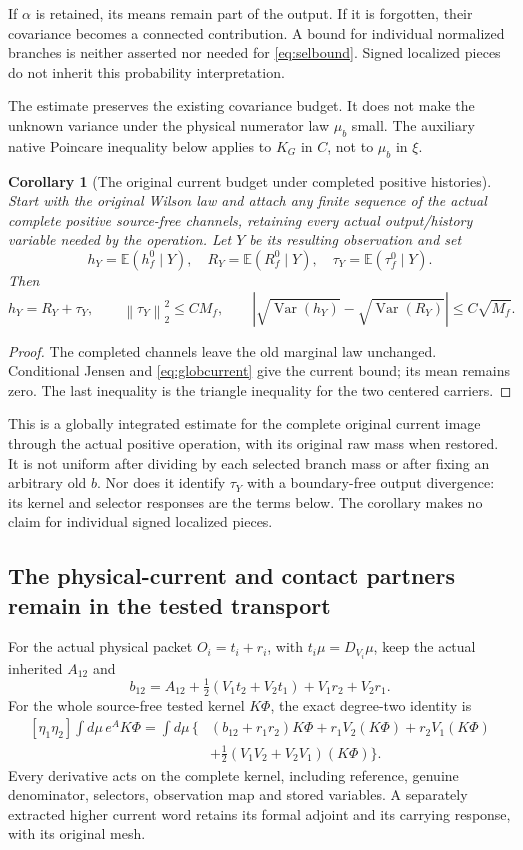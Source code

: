 \documentclass[11pt,letterpaper]{article}
\newtheorem{corollary}[theorem]{Corollary}
\theoremstyle{remark}\newtheorem{remark}[theorem]{Remark}
\newcommand{\E}{\mathbb E}
\newcommand{\Var}{\operatorname{Var}}\newcommand{\Cov}{\operatorname{Cov}}
\newcommand{\norm}[1]{\left\lVert#1\right\rVert}
\begin{document}
If $\alpha$ is retained, its means remain part of the output. If it is forgotten, their covariance becomes a connected contribution. A bound for individual normalized branches is neither asserted nor needed for \eqref{eq:selbound}. Signed localized pieces do not inherit this probability interpretation.

The estimate preserves the existing covariance budget. It does not make the unknown variance under the physical numerator law $\mu_b$ small. The auxiliary native Poincare inequality below applies to $K_G$ in $C$, not to $\mu_b$ in $\xi$.

\begin{corollary}[The original current budget under completed positive histories]\label{cor:mixedcurrent}
Start with the original Wilson law and attach any finite sequence of the actual complete positive source-free channels, retaining every actual output/history variable needed by the operation. Let $Y$ be its resulting observation and set
\[
 h_Y=\E(h_f^0\mid Y),\quad R_Y=\E(R_f^0\mid Y),\quad
 \tau_Y=\E(\tau_f^0\mid Y).
\]
Then
\[
 h_Y=R_Y+\tau_Y,\qquad \norm{\tau_Y}_2^2\le CM_f,\qquad
 \left|\sqrt{\Var(h_Y)}-\sqrt{\Var(R_Y)}\right|
 \le C\sqrt{M_f}.
\]
\end{corollary}
\begin{proof}
The completed channels leave the old marginal law unchanged. Conditional Jensen and \eqref{eq:globcurrent} give the current bound; its mean remains zero. The last inequality is the triangle inequality for the two centered carriers.
\end{proof}

This is a globally integrated estimate for the complete original current image through the actual positive operation, with its original raw mass when restored. It is not uniform after dividing by each selected branch mass or after fixing an arbitrary old $b$. Nor does it identify $\tau_Y$ with a boundary-free output divergence: its kernel and selector responses are the terms below. The corollary makes no claim for individual signed localized pieces.

\subsection{The physical-current and contact partners remain in the tested transport}

For the actual physical packet $O_i=t_i+r_i$, with
$t_i\mu=D_{V_i}\mu$, keep the actual inherited $A_{12}$ and
\[
 b_{12}=A_{12}+\tfrac12(V_1t_2+V_2t_1)+V_1r_2+V_2r_1.
\]
For the whole source-free tested kernel $K\Phi$, the exact degree-two identity is
\begin{align}\label{eq:tested}
 [\eta_1\eta_2]\int d\mu\,e^A K\Phi
 =\int d\mu\,\bigl\{
 &(b_{12}+r_1r_2)K\Phi+r_1V_2(K\Phi)+r_2V_1(K\Phi)\\
 &+\tfrac12(V_1V_2+V_2V_1)(K\Phi)\bigr\}.\nonumber
\end{align}
Every derivative acts on the complete kernel, including reference, genuine denominator, selectors, observation map and stored variables. A separately extracted higher current word retains its formal adjoint and its carrying response, with its original mesh.
\end{document}
